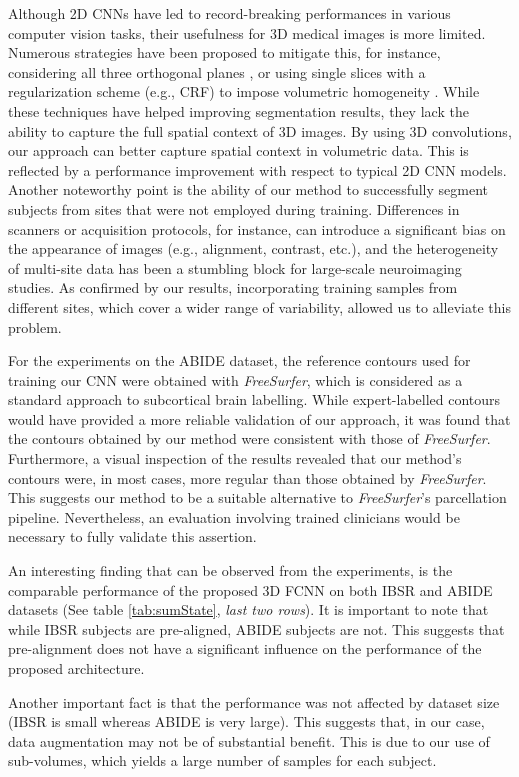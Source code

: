 \documentclass[twoside,fleqn,espcrc2]{elsarticle}
\newcommand{\FreeSurfer}{\textit{FreeSurfer}}
\begin{document}
Although 2D CNNs have led to record-breaking performances in various computer vision tasks, their usefulness for 3D medical images is more limited. Numerous strategies have been proposed to mitigate this, for instance, considering all three orthogonal planes \cite{Brebisson2015deep}, or using single slices with a regularization scheme (e.g., CRF) to impose volumetric homogeneity \cite{shakeri2016sub}. While these techniques have helped improving segmentation results, they lack the ability to capture the full spatial context of 3D images. By using 3D convolutions, our approach can better capture spatial context in volumetric data. This is reflected by a performance improvement with respect to typical 2D CNN models. Another noteworthy point is the ability of our method to successfully segment subjects from sites that were not employed during training. Differences in scanners or acquisition protocols, for instance, can introduce a significant bias on the appearance of images (e.g., alignment, contrast, etc.), and the heterogeneity of multi-site data has been a stumbling block for large-scale neuroimaging studies. As confirmed by our results, incorporating training samples from different sites, which cover a wider range of variability, allowed us to alleviate this problem.

For the experiments on the ABIDE dataset, the reference contours used for training our CNN were obtained with \FreeSurfer{}, which is considered as a standard approach to subcortical brain labelling. While expert-labelled contours would have provided a more reliable validation of our approach, it was found that the contours obtained by our method were consistent with those of \FreeSurfer{}. Furthermore, a visual inspection of the results revealed that our method's contours were, in most cases, more regular than those obtained by \FreeSurfer{}. This suggests our method to be a suitable alternative to \FreeSurfer{}'s parcellation pipeline. Nevertheless, an evaluation involving trained clinicians would be necessary to fully validate this assertion. 

An interesting finding that can be observed from the experiments, is the comparable performance of the proposed 3D FCNN on both IBSR and ABIDE datasets (See table \ref{tab:sumState}, \textit{last two rows}). It is important to note that while IBSR subjects are pre-aligned, ABIDE subjects are not. This suggests that pre-alignment does not have a significant influence on the performance of the proposed architecture. 

Another important fact is that the performance was not affected by dataset size (IBSR is small whereas ABIDE is very large). 
This suggests that, in our case, data augmentation may not be of substantial benefit. This is due to our use of sub-volumes, which yields a large number of samples for each subject.
\end{document}

